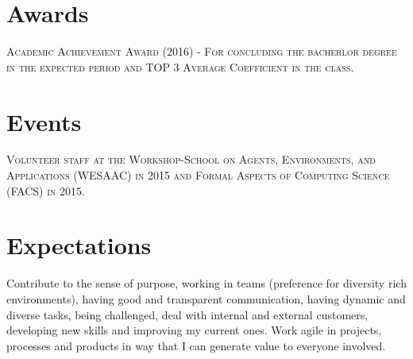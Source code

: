 \documentclass[a4paper,10pt]{article}
\begin{document}
\section {Awards}

\textsc{Academic Achievement Award (2016) - For concluding the bacherlor degree in the expected period and TOP 3 Average Coefficient in the class.}

\section {Events}

\textsc{Volunteer staff at the Workshop-School on Agents, Environments, and Applications (WESAAC) in 2015 and Formal Aspects of Computing Science (FACS) in 2015.}

\section {Expectations}

Contribute to the sense of purpose, working in teams (preference for diversity rich environments), having good and transparent communication, having dynamic and diverse tasks, being challenged, deal with internal and external customers, developing new skills and improving my current ones. Work agile in projects, processes and products in way that I can generate value to everyone involved.   
\end{document}
